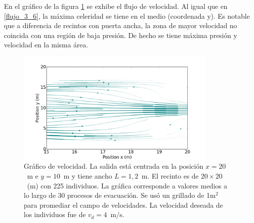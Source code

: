 En el gráfico de la figura \ref{flujo_1_2} se exhibe el flujo de velocidad. Al igual que en \ref{flujo_3_6}, la máxima celeridad se tiene en el medio (coordenada y).
Es notable que a diferencia de recintos con puerta ancha, la zona de mayor velocidad no coincida con una región de baja presión. De hecho se tiene máxima presión y velocidad en la misma área.  

\begin{figure}[H]
    \centering
    \includegraphics[height=5.5cm]{figuras/flujo_door_1_2m.png}
    \caption[width=5cm]{Gráfico de velocidad. La salida está centrada en la posición $x=20$~m e $y=10$~m y tiene ancho $L=1,2$~m. El recinto es de $20\times 20$~(m) con 225 individuos. La gráfica corresponde a valores medios a lo largo de 30 procesos de evacuación. Se usó un grillado de 1m$^2$ para promediar el campo de velocidades. La velocidad deseada de los individuos fue de $v_d=4$~m/s.}
    \label{flujo_1_2}
\end{figure}

